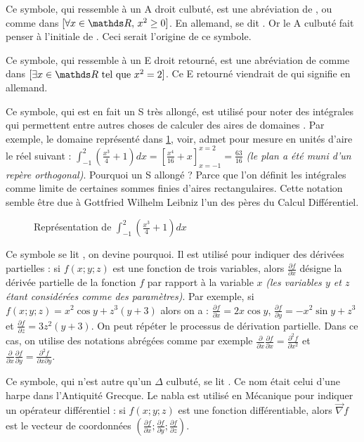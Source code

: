\cadre{$\forall$} Ce symbole, qui ressemble à un A droit culbuté, est une abréviation
de , ou  comme dans
$ [ \forall x \in \RR, \, x^2 \geq 0 ] $. En allemand,  se dit .
Or le A culbuté fait penser à l'initiale de . Ceci serait l'origine
de ce symbole.


\cadre{$\exists$} Ce symbole, qui ressemble à un E droit retourné, est une abréviation
de  comme dans $[ \exists x \in \RR \text{ tel que } x^2 = 2 ]$.
Ce E retourné viendrait de  qui signifie  en allemand.


\cadre{{\Large$\int$}} Ce symbole, qui est en fait un S très allongé, est utilisé
pour noter des intégrales qui permettent entre autres choses de calculer des aires
de domaines . Par exemple, le domaine représenté dans
 \ref{domainIntegral}, voir, admet pour mesure en unités d'aire le réel suivant :
$ {\displaystyle \int_{-1}^{2}} (\frac{x^3}{4} + 1) d x = [ \frac{x^4}{16} + x ]_{x=-1}^{x=2} = \frac{63}{16}$
 \emph{(le plan a été muni d'un repère orthogonal)}.
Pourquoi un S allongé ? Parce que l'on définit les intégrales comme limite
de certaines sommes finies d'aires rectangulaires. Cette notation semble être
due à Gottfried Wilhelm Leibniz l'un des pères du Calcul Différentiel.

\begin{figure}[h]
    
    \vspace{-2em}
    \caption{%
        Représentation de%
        $ \displaystyle \int_{-1}^{2} \left( \frac{x^3}{4} + 1 \right)  d x $%
    }
    \label{domainIntegral}
\end{figure}


\cadre{$\partial$} Ce symbole\label{partialDer} se lit , on devine pourquoi.
Il est utilisé pour indiquer des dérivées partielles : si $f(x;y;z)$ est une fonction
de trois variables, alors $\frac{\partial f}{\partial x} $ désigne la dérivée partielle
de la fonction $f$ par rapport à la variable $x$ \emph{(les variables $y$ et $z$ étant
considérées comme des paramètres)}.
Par exemple, si $f(x;y;z) = x^{2} \cos y +  z^{3} (y + 3)$ alors on a :
$\frac{\partial f}{\partial x}  = 2 x \cos y$, $\frac{\partial f}{\partial y}  = - x^2 \sin y +  z^3$
et $\frac{\partial f}{\partial z}  = 3 z^2 (y + 3)$.
On peut répéter le processus de dérivation partielle. Dans ce cas, on utilise
des notations abrégées comme par exemple
$\frac{\partial}{\partial x} \frac{\partial f}{\partial x}  = \frac{\partial^2 f}{\partial x^2} $
et
$\frac{\partial}{\partial x} \frac{\partial f}{\partial y}  = \frac{\partial^2 f}{\partial x \partial y} $.


\cadre{$\nabla$} Ce symbole, qui n'est autre qu'un $\Delta$ culbuté, se lit .
Ce nom était celui d'une harpe dans l'Antiquité Grecque. Le nabla est utilisé en Mécanique
pour indiquer un opérateur différentiel : si $f(x;y;z)$ est une fonction différentiable,
alors $\vec{\nabla} f $ est le vecteur de coordonnées
$( \frac{\partial f}{\partial x} ; \frac{\partial f}{\partial y} ; \frac{\partial f}{\partial z})$.
